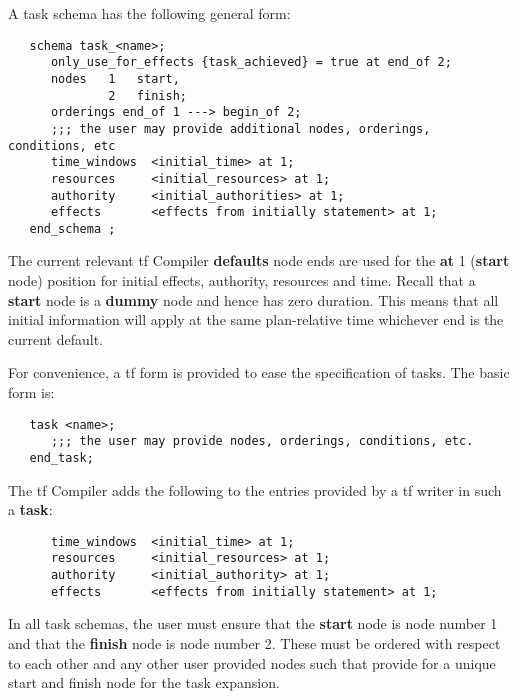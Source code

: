 
A task schema has the following general form:

\begin{verbatim}
   schema task_<name>;
      only_use_for_effects {task_achieved} = true at end_of 2;
      nodes   1   start,
              2   finish;
      orderings end_of 1 ---> begin_of 2;
      ;;; the user may provide additional nodes, orderings, conditions, etc
      time_windows  <initial_time> at 1;
      resources     <initial_resources> at 1;
      authority     <initial_authorities> at 1;
      effects       <effects from initially statement> at 1;
   end_schema ;
\end{verbatim}

The current relevant {\sc tf} Compiler {\bf defaults} node ends are
used for the {\bf at} 1 ({\bf start} node) position for initial
effects, authority, resources and time.  Recall that a {\bf start}
node is a {\bf dummy} node and hence has zero duration.  This means
that all initial information will apply at the same plan-relative time
whichever end is the current default.

For convenience, a {\sc tf} form is provided to ease the specification of
tasks.  The basic form is:

\begin{verbatim}
   task <name>;
      ;;; the user may provide nodes, orderings, conditions, etc.
   end_task;
\end{verbatim}

The {\sc tf} Compiler adds the following to the entries provided by a {\sc tf}
writer in such a {\bf task}:

\begin{verbatim}
      time_windows  <initial_time> at 1;
      resources     <initial_resources> at 1;
      authority     <initial_authority> at 1;
      effects       <effects from initially statement> at 1;
\end{verbatim}

In all task schemas, the user must ensure that the {\bf start} node
is node number 1 and that the {\bf finish} node is node number 2.
These must be ordered with respect to each other and any other user provided
nodes such that provide for a unique start and finish node for the
task expansion.


